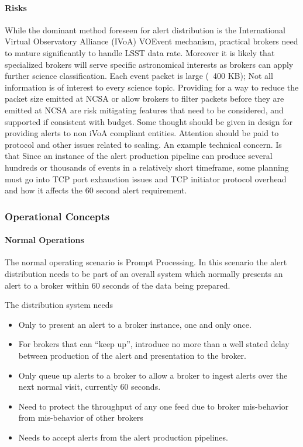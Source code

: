 \paragraph{Risks}
While the dominant method foreseen for alert distribution is the International Virtual Observatory Alliance (IVoA) VOEvent mechanism, practical brokers need to mature significantly to handle LSST data rate.  Moreover it is likely that specialized brokers will serve specific astronomical interests as brokers can apply further science classification.  Each event packet is large (~400 KB); Not all information is of interest to every science topic. Providing for a way to reduce the packet size emitted at NCSA or allow brokers to filter packets before they are emitted at NCSA are risk mitigating features that need to be considered, and supported if consistent with budget.  Some thought should be given in design for providing alerts to non iVoA compliant entities. Attention should be paid to protocol and other issues related to scaling.  An example technical concern. Is that  Since an instance of the alert production pipeline can produce several hundreds or thousands of events in a relatively short timeframe, some planning must go into TCP port exhaustion issues and TCP initiator protocol overhead and how it affects the 60 second alert requirement.

\subsubsection{Operational Concepts}

\paragraph{Normal Operations}
The normal operating scenario is Prompt Processing. In this scenario the alert distribution needs to be part of an overall system which normally presents an alert to a broker within 60 seconds of the data being prepared. 

The distribution system needs

\begin{itemize}

\item Only to present an alert to a broker instance, one and only once.

\item For brokers that can “keep up”, introduce no more than a well stated  delay between production of the alert and presentation to the broker.  

\item Only queue up alerts to a broker to allow a broker to ingest alerts over the next normal visit, currently 60 seconds.

\item Need to protect the throughput of any one feed due to broker mis-behavior from mis-behavior of other brokers

\item Needs to accept alerts from the alert production pipelines.

\end{itemize}

